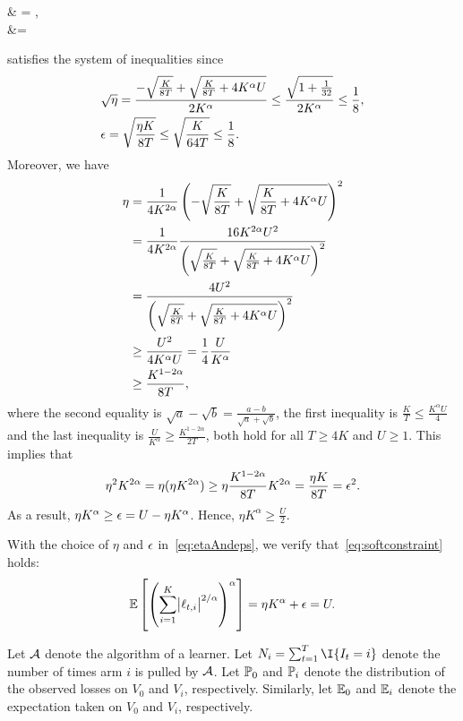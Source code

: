 \begin{nalign}
    &\sqrt{\eta} = , \\
    &\eps = 
    \label{eq:etaAndeps}
\end{nalign}
satisfies the system of inequalities since 
\begin{align*}
    &\sqrt{\eta} = \frac{-\sqrtfrac{K}{8T} + \sqrt{\frac{K}{8T} + 4K^\alpha U}}{2K^\alpha} \leq \frac{\sqrt{1 + \frac{1}{32}}}{2K^\alpha} \leq \frac{1}{8}, \\
    &\eps = \sqrtfrac{\eta K}{8T} \leq \sqrtfrac{K}{64T} \leq \frac{1}{8}.
\end{align*}
Moreover, we have
\begin{align*}
    \eta  &= \frac{1}{4K^{2\alpha}}\left(-\sqrtfrac{K}{8T} + \sqrt{\frac{K}{8T} + 4K^\alpha U}\right)^2 \\
    &= \frac{1}{4K^{2\alpha}} \frac{16K^{2\alpha} U^2}{\left(\sqrtfrac{K}{8T} + \sqrt{\frac{K}{8T} + 4K^\alpha U}\right)^2} \\
    &= \frac{4U^2}{\left(\sqrtfrac{K}{8T} + \sqrt{\frac{K}{8T} + 4K^\alpha U}\right)^2} \\
    &\geq \frac{U^2}{4K^\alpha U} = \frac{1}{4}\frac{U}{K^\alpha} \\
    &\geq \frac{K^{1-2\alpha}}{8T},
\end{align*}
where the second equality is $\sqrt{a} - \sqrt{b} = \frac{a-b}{\sqrt{a}+\sqrt{b}}$, the first inequality is $\frac{K}{T} \leq \frac{K^\alpha U}{4}$ and the last inequality is $\frac{U}{K^\alpha} \geq \frac{K^{1-2\alpha}}{2T}$, both hold for all $T \geq 4K$ and $U \geq 1$. This implies that
\begin{align*}
    \eta^2 K^{2\alpha} = \eta (\eta K^{2\alpha}) \geq \eta \frac{K^{1-2\alpha}}{8T} K^{2\alpha} = \frac{\eta K}{8T} = \eps^2.
\end{align*}
As a result, $\eta K^\alpha \geq \eps = U - \eta K^\alpha$. Hence, $\eta K^\alpha \geq \frac{U}{2}$.

With the choice of $\eta$ and $\eps$ in~\eqref{eq:etaAndeps}, we verify that~\eqref{eq:softconstraint} holds:
\begin{align*}
    \E\left[\left(\sum_{i=1}^K \abs{\ell_{t,i}}^{2/\alpha}\right)^\alpha \right] = \eta K^\alpha + \eps = U.
\end{align*}

Let $\gA$ denote the algorithm of a learner. 
Let $N_i = \sum_{t=1}^{T} \I{I_t = i}$ denote the number of times arm $i$ is pulled by $\gA$. 
Let $\P_0$ and $\P_i$ denote the distribution of the observed losses on $V_0$ and $V_i$, respectively.
Similarly, let $\E_0$ and $\E_i$ denote the expectation taken on $V_0$ and $V_i$, respectively. 

